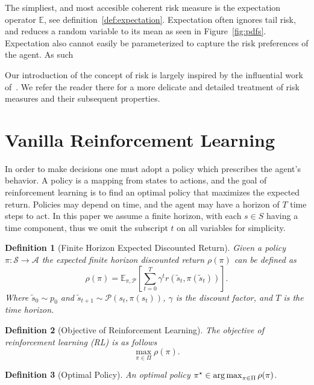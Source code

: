 \documentclass[10pt]{article}
\newtheorem{definition}{Definition}
\renewcommand{\cite}{\citep}
\theoremstyle{plain}
\theoremstyle{remark}
\begin{document}
The simpliest, and most accesible coherent risk measure is the expectation operator $\mathbb{E}$, see definition~\ref{def:expectation}. \label{sec:explanation-of-why-risk-measures-are-important}
Expectation often ignores tail risk, and reduces a random variable to its mean as seen in Figure~\ref{fig:pdfs}.
Expectation also cannot easily be parameterized to capture the risk preferences of the agent.
As such


Our introduction of the concept of risk is largely inspired by the influential work of~\cite{follmer2016}. We refer the reader there for a more delicate and detailed treatment of risk measures and their subsequent properties.

\section{Vanilla Reinforcement Learning}
\label{sec:vanilla-reinforcement-learning}

In order to make decisions one must adopt a policy which prescribes the agent's behavior.
A policy is a mapping from states to actions, and the goal of reinforcement learning is to find an optimal policy that maximizes the expected return.
Policies may depend on time, and the agent may have a horizon of $T$ time steps to act. 
In this paper we assume a finite horizon, with each $s \in S$ having a time component, thus we omit the subscript $t$ on all variables for simplicity.

\begin{definition}[Finite Horizon Expected Discounted Return]
        Given a policy $\pi : \mathcal{S} \to \mathcal{A}$ the expected finite horizon discounted return $\rho(\pi)$ can be defined as
        \[ 
          \rho(\pi) = \mathbb{E}_{\pi, \mathcal{P}} \left[ \sum_{t=0}^{T} \gamma^t r(\tilde{s}_t, \pi(\tilde{s}_t)) \right].
        \]
        Where $\tilde{s}_0 \sim p_0$ and $\tilde{s}_{t+1} \sim \mathcal{P}(s_t, \pi(s_t))$, $\gamma$ is the discount factor, and $T$ is the time horizon.
\end{definition}

\begin{definition}[Objective of Reinforcement Learning]\label{def:rl_obj}
        The objective of reinforcement learning (RL) is as follows
        \[
        \max_{\pi \in \Pi} \rho(\pi). 
        \]
\end{definition}

\begin{definition}[Optimal Policy]\label{def:optimal_policy}
        An optimal policy $\pi^\star \in \operatorname*{arg\,max}_{\pi \in \Pi} \rho(\pi)$.
\end{definition}
\end{document}
